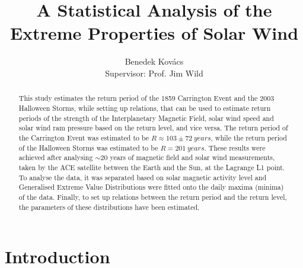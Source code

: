 \documentclass[12pt]{article}
\title{\vspace{-2em}A Statistical Analysis of the Extreme Properties of Solar Wind}
\author{Benedek Kovács\\ Supervisor: Prof. Jim Wild}
\date{}
\begin{document}
\maketitle
\begin{center}
\end{center}
\bigskip
\begin{abstract}
    \noindent This study estimates the return period of the 1859 Carrington Event and the 2003 Halloween Storms, while setting up relations, that can be used to estimate return periods of the strength of the Interplanetary Magnetic Field, solar wind speed and solar wind ram pressure based on the return level, and vice versa. The return period of the Carrington Event was estimated to be $R\approx 103\pm72\ years$, while the return period of the Halloween Storms was estimated to be $R=201\ years$. These results were achieved after analysing $\sim 20$ years of magnetic field and solar wind measurements, taken by the ACE satellite between the Earth and the Sun, at the Lagrange L1 point. To analyse the data, it was separated based on solar magnetic activity level and Generalised Extreme Value Distributions were fitted onto the daily maxima (minima) of the data. Finally, to set up relations between the return period and the return level, the parameters of these distributions have been estimated.
\end{abstract}
\newpage
\restoregeometry
\tableofcontents
\newpage
{}

\section{Introduction}\label{sec:introduction}
\end{document}
